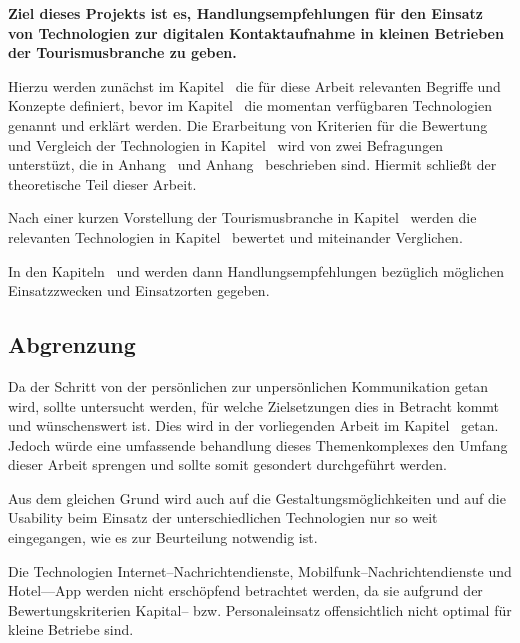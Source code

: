 \textbf{Ziel dieses Projekts ist es, Handlungsempfehlungen für den Einsatz von Technologien zur digitalen Kontaktaufnahme in kleinen Betrieben der Tourismusbranche zu geben.}

Hierzu werden zunächst im Kapitel~ die für diese Arbeit relevanten Begriffe und Konzepte definiert, bevor im Kapitel~ die momentan verfügbaren Technologien genannt und erklärt werden. Die Erarbeitung von Kriterien für die Bewertung und Vergleich der Technologien in Kapitel~ wird von zwei Befragungen unterstüzt, die in Anhang~ und Anhang~ beschrieben sind. Hiermit schließt der theoretische Teil dieser Arbeit. 

Nach einer kurzen Vorstellung der Tourismusbranche in Kapitel~ werden die relevanten Technologien in Kapitel~ bewertet und miteinander Verglichen.

In den Kapiteln~ und  werden dann Handlungsempfehlungen bezüglich möglichen Einsatzzwecken und Einsatzorten gegeben.


\subsection{Abgrenzung}

Da der Schritt von der persönlichen  zur unpersönlichen Kommunikation getan wird, sollte untersucht werden, für welche Zielsetzungen dies in Betracht kommt und wünschenswert ist. Dies wird in der vorliegenden Arbeit im Kapitel~ getan. Jedoch würde eine umfassende behandlung dieses Themenkomplexes den Umfang dieser Arbeit sprengen und sollte somit gesondert durchgeführt werden.

Aus dem gleichen Grund wird auch auf die Gestaltungsmöglichkeiten und auf die Usability beim Einsatz der unterschiedlichen Technologien nur so weit eingegangen, wie es zur Beurteilung notwendig ist.

Die Technologien Internet--Nachrichtendienste, Mobilfunk--Nachrichtendienste und Hotel––App werden nicht erschöpfend betrachtet werden, da sie aufgrund der Bewertungskriterien Kapital-- bzw. Personaleinsatz offensichtlich nicht optimal für kleine Betriebe sind.

